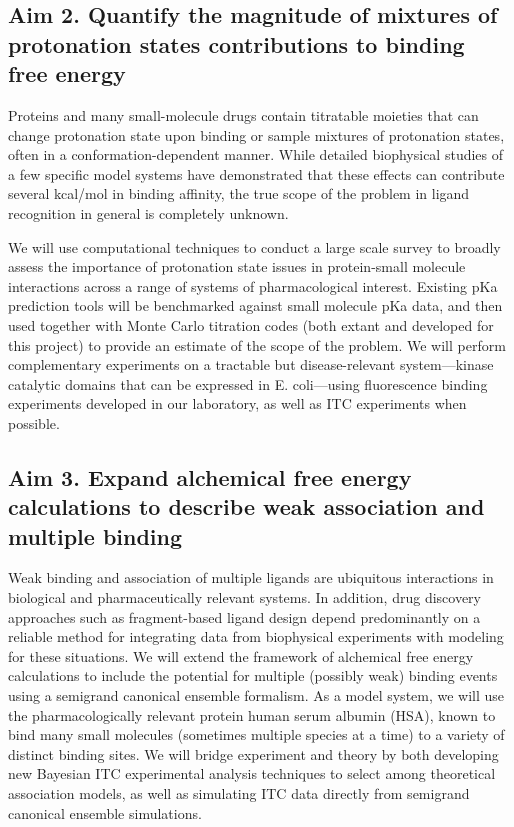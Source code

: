 \documentclass[10pt]{article}
\begin{document}
\subsection*{Aim 2. Quantify the magnitude of mixtures of protonation states contributions to binding free energy}
Proteins and many small-molecule drugs contain titratable moieties that can change protonation state upon binding or sample mixtures of protonation states, often in a conformation-dependent manner. 
While detailed biophysical studies of a few specific model systems have demonstrated that these effects can contribute several kcal/mol in binding affinity, the true scope of the problem in ligand recognition in general is completely unknown. 

We will use computational techniques to conduct a large scale survey to broadly assess the importance of protonation state issues in protein-small molecule interactions across a range of systems of pharmacological interest. 
Existing pKa prediction tools will be benchmarked against small molecule pKa data, and then used together with Monte Carlo titration codes (both extant and developed for this project) to provide an estimate of the scope of the problem. 
We will perform complementary experiments on a tractable but disease-relevant system---kinase catalytic domains that can be expressed in E. coli---using fluorescence binding experiments developed in our laboratory, as well as ITC experiments when possible.

\subsection*{Aim 3. Expand alchemical free energy calculations to describe weak association and multiple binding}
Weak binding and association of multiple ligands are ubiquitous interactions in biological and pharmaceutically relevant systems.
In addition, drug discovery approaches such as fragment-based ligand design depend predominantly on a reliable method for integrating data from biophysical experiments with modeling for these situations.
We will extend the framework of alchemical free energy calculations to include the potential for multiple (possibly weak) binding events using a semigrand canonical ensemble formalism. 
As a model system, we will use the pharmacologically relevant protein human serum albumin (HSA), known to bind many small molecules (sometimes multiple species at a time) to a variety of distinct binding sites.
We will bridge experiment and theory by both developing new Bayesian ITC experimental analysis techniques to select among theoretical association models, as well as simulating ITC data directly from semigrand canonical ensemble simulations.
\end{document}
